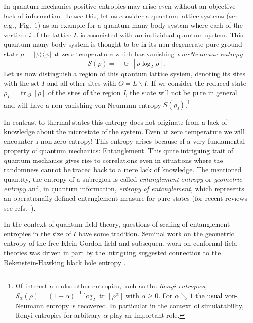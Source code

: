 \documentclass[rmp,floatfix,12pt,preprint]{revtex4-2} %
\DeclareMathOperator{\tr}{tr\,}
\begin{document}
In quantum mechanics positive entropies may arise even without an 
objective lack of information. To see this, let us consider a 
quantum lattice systems (see e.g.,\ Fig.\ 1) as an example for a 
quantum many-body system where each of the vertices $i$ of 
the lattice $L$ is associated with an individual quantum system. 
This quantum many-body system is thought to be in its non-degenerate 
pure ground state $\rho=|\psi\rangle\langle\psi|$ at zero temperature
which has vanishing {\it von-Neumann entropy} 
\begin{equation*}
        S(\rho) = - \tr[\rho \log_2 \rho].
\end{equation*}
Let us now distinguish a region of this quantum lattice 
system, denoting its sites with the set $I$ and all other 
sites with $O=L\backslash I$. If we consider the reduced state 
$\rho_I= \tr_{O}[\rho]$ of the sites of the region $I$, 
the state will not be pure in general and will have a 
non-vanishing von-Neumann entropy $S(\rho_I)$.\footnote{Of interest are also other entropies, such as the 
{\it Renyi entropies}, $S_\alpha(\rho) =(1-\alpha)^{-1} 
\log_2 \tr [\rho^\alpha]$ with $\alpha\geq 0$. For 
$\alpha\searrow 1$ the usual von-Neumann entropy is recovered. 
In particular in the context of simulatability, Renyi entropies 
for arbitrary $\alpha$ play an important role.}

In contrast to thermal states this entropy does not originate 
from a lack of knowledge about the microstate of the system. 
Even at zero temperature we will encounter a non-zero 
entropy! This entropy arises because of a very fundamental property 
of quantum mechanics: Entanglement. This quite intriguing 
trait of quantum mechanics gives rise to correlations even
in situations where the randomness cannot be traced back 
to a mere lack of knowledge. The mentioned quantity, the entropy 
of a subregion is called {\it entanglement entropy} or  
{\it geometric entropy} and, in quantum information,
{\it entropy of entanglement}, which 
 represents an operationally defined entanglement 
measure for pure states (for recent reviews see refs.\ \cite{Horodecki,InHouseReview}).

In the context of quantum field theory, questions of scaling
of entanglement entropies  in the size of $I$ have some tradition. Seminal work on the 
geometric entropy of the free Klein-Gordon field 
\cite{Bombelli,Srednicki} and subsequent work on conformal field
theories \cite{Larsen,Callan,PreskillOld,Calabrese,HardStuff} was 
driven in part by the intriguing suggested connection to the 
Bekenstein-Hawking black hole entropy 
\cite{Bekenstein,Hawking74,BekensteinCP}. 
\end{document}
